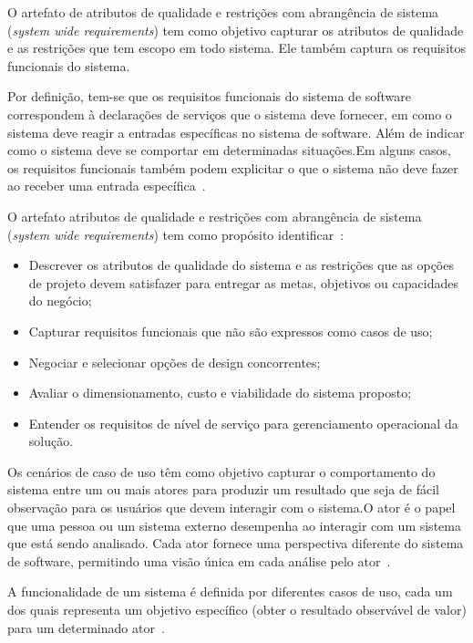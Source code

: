 O artefato de atributos de qualidade e restrições com abrangência de sistema (\emph{system wide requirements}) tem como objetivo  capturar os atributos de qualidade e as restrições que tem escopo em todo sistema. Ele também captura os requisitos funcionais do sistema.

Por definição, tem-se que os requisitos funcionais do sistema de software correspondem à declarações de serviços que o sistema deve fornecer, em como o sistema deve reagir a
entradas específicas no sistema de software. Além de indicar como o sistema deve se comportar em determinadas situações.Em alguns casos, os
requisitos funcionais também podem explicitar o que o sistema não deve fazer ao receber uma entrada específica~\cite{Sommerville_2011_texbook}.

O artefato atributos de qualidade e restrições com abrangência de sistema (\emph{system wide requirements})  tem como propósito identificar~\cite{openup}:

\begin{itemize}
    \item Descrever os atributos de qualidade do sistema e as restrições que as opções de projeto devem satisfazer para entregar as metas, objetivos ou capacidades do negócio;
    \item Capturar requisitos funcionais que não são expressos como casos de uso;
    \item Negociar e selecionar opções de design concorrentes;
    \item Avaliar o dimensionamento, custo e viabilidade do sistema proposto;
    \item Entender os requisitos de nível de serviço para gerenciamento operacional da solução.
\end{itemize}

Os cenários de caso de uso têm como objetivo capturar o comportamento do sistema entre um ou mais atores para produzir um resultado que seja de fácil observação para os usuários que devem interagir com o sistema.O ator é o papel que uma pessoa ou um sistema externo desempenha ao interagir com um sistema que está sendo analisado. Cada ator fornece uma perspectiva diferente do sistema de software, permitindo uma visão única em cada análise pelo ator~\cite{openup}.

A funcionalidade de um sistema é definida por diferentes casos de uso, cada um dos quais representa um objetivo específico (obter o resultado observável de valor) para um determinado ator~\cite{openup}.

